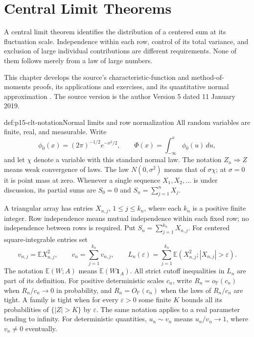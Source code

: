 \chapter{Central Limit Theorems}
\label{sec:p15-central-limit-theorems}

A central limit theorem identifies the distribution of a centered sum
at its fluctuation scale. Independence within each row, control of its
total variance, and exclusion of large individual contributions are
different requirements. None of them follows merely from a law of large
numbers.

This chapter develops the source's characteristic-function and
method-of-moments proofs, its applications and exercises, and its
quantitative normal approximation
\cite[Section~3.4, pp.~144--161]{DurrettPTEAuthor2019}.
The source version is the author Version 5 dated 11 January 2019.

\begin{hbdefinition}{def:p15-clt-notation}{Normal limits and row normalization}
All random variables are finite, real, and measurable. Write
\[
 \phi_0(x)=(2\pi)^{-1/2}e^{-x^2/2},\qquad
 \Phi(x)=\int_{-\infty}^x\phi_0(u)\,du,
\]
and let \(\chi\) denote a variable with this standard normal law.
The notation \(Z_n\Rightarrow Z\) means weak convergence of laws.
The law \(N(0,\sigma^2)\) means that of \(\sigma\chi\);
at \(\sigma=0\) it is point mass at zero.
Whenever a single sequence \(X_1,X_2,\ldots\) is under
discussion, its partial sums are \(S_0=0\) and
\(S_n=\sum_{j=1}^nX_j\).

A triangular array has entries \(X_{n,j}\), \(1\leq j\leq k_n\),
where each \(k_n\) is a positive finite integer. Row independence
means mutual independence within each fixed row; no independence
between rows is required. Put \(S_n=\sum_{j=1}^{k_n}X_{n,j}\).
For centered square-integrable entries set
\[
 v_{n,j}=\mathbb EX_{n,j}^2,\qquad
 v_n=\sum_{j=1}^{k_n}v_{n,j},\qquad
 L_n(\varepsilon)=
 \sum_{j=1}^{k_n}\mathbb E(X_{n,j}^2;
                                  |X_{n,j}|>\varepsilon).
\]
The notation \(\mathbb E(W;A)\) means
\(\mathbb E(W\mathbf1_A)\). All strict cutoff inequalities in
\(L_n\) are part of its definition.
For positive deterministic scales \(c_n\), write
\(R_n=o_{\mathbb P}(c_n)\) when \(R_n/c_n\to0\) in probability,
and \(R_n=O_{\mathbb P}(c_n)\) when the laws of \(R_n/c_n\)
are tight. A family is tight when for every \(\varepsilon>0\)
some finite \(K\) bounds all its probabilities of \(\{|Z|>K\}\)
by \(\varepsilon\). The same notation applies to a real parameter
tending to infinity. For deterministic quantities, \(u_n\sim v_n\)
means \(u_n/v_n\to1\), where \(v_n\ne0\) eventually.
\end{hbdefinition}

